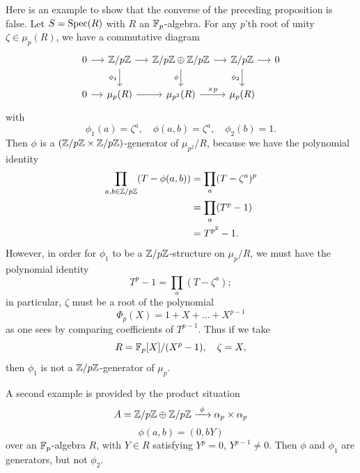 \begin{remark}\label{rem:1.11.4}
Here is an example to show that the converse of the preceding proposition is false. Let $S = \operatorname{Spec}(R)$ with $R$ an $\mathbb{F}_p$-algebra. For any $p$'th root of unity $\zeta \in \mu_p(R)$, we have a commutative diagram
\[
\begin{tikzcd}[column sep=small]
0 \arrow[r] & \Z/p\Z \arrow[r] \arrow[d, "\phi_1"'] & \Z/p\Z \oplus \Z/p\Z \arrow[r] \arrow[d, "\phi"'] & \Z/p\Z \arrow[r] \arrow[d, "\phi_2"'] & 0 \\
0 \arrow[r] & \mu_p(R) \arrow[r] & \mu_{p^2}(R) \arrow[r, "\times p"] & \mu_p(R)
\end{tikzcd}
\]
with
\[
\phi_1(a) = \zeta^a, \quad \phi(a, b) = \zeta^a, \quad \phi_2(b) = 1.
\]
Then $\phi$ is a $(\mathbb{Z}/p\mathbb{Z} \times \mathbb{Z}/p\mathbb{Z})$-generator of $\mu_{p^2}/R$, because we have the polynomial identity
\begin{align*}
\prod_{a, b \in \mathbb{Z}/p\mathbb{Z}} (T - \phi(a, b)) &= \prod_a (T - \zeta^a)^p \\
&= \prod_a (T^p - 1) \\
&= T^{p^2} - 1.
\end{align*}
However, in order for $\phi_1$ to be a $\mathbb{Z}/p\mathbb{Z}$-structure on $\mu_p/R$, we must have the polynomial identity
\[
T^p - 1 = \prod_a (T - \zeta^a);
\]
in particular, $\zeta$ must be a root of the polynomial
\[
\Phi_p(X) = 1 + X + \dots + X^{p-1}
\]
as one sees by comparing coefficients of $T^{p-1}$. Thus if we take
\[
R = \mathbb{F}_p[X]/(X^p - 1), \quad \zeta = X,
\]
then $\phi_1$ is not a $\mathbb{Z}/p\mathbb{Z}$-generator of $\mu_p$.

A second example is provided by the product situation
\[
A = \mathbb{Z}/p\mathbb{Z} \oplus \mathbb{Z}/p\mathbb{Z} \xrightarrow{\ \phi\ } \alpha_p \times \alpha_p
\]
\[
\phi(a, b) = (0, bY)
\]
over an $\mathbb{F}_p$-algebra $R$, with $Y \in R$ satisfying $Y^p = 0$, $Y^{p-1} \neq 0$. Then $\phi$ and $\phi_1$ are generators, but not $\phi_2$.
\end{remark}

